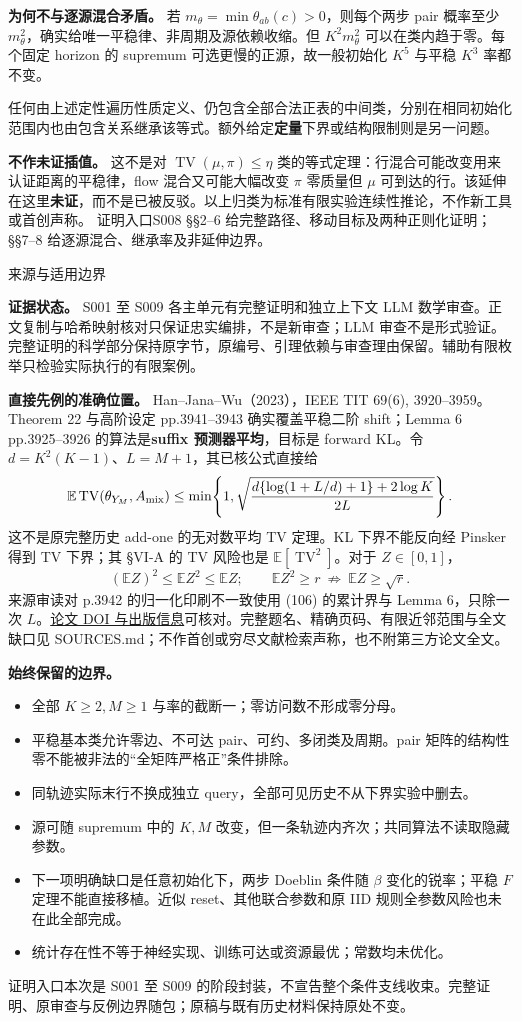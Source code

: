 \documentclass[11pt,a4paper]{article}
\renewcommand{\emph}[1]{\textbf{#1}}
\newcommand{\TV}{\operatorname{TV}}
\newcommand{\E}{\mathbb E}
\newcommand{\head}[2]{\begin{center}{\large\sffamily\color{ink}#1}\end{center}\vspace{-4pt}{\LARGE\bfseries #2}\par\vspace{5pt}}
\newcommand{\entry}[1]{\vfill\noindent\small\textcolor{ink}{证明入口}\quad#1\normalsize}
\begin{document}
\textbf{为何不与逐源混合矛盾。} 若 $m_\theta=\min\theta_{ab}(c)>0$，则每个两步 pair 概率至少 $m_\theta^2$，确实给唯一平稳律、非周期及源依赖收缩。但 $K^2m_\theta^2$ 可以在类内趋于零。每个固定 horizon 的 supremum 可选更慢的正源，故一般初始化 $K^5$ 与平稳 $K^3$ 率都不变。

任何由上述定性遍历性质定义、仍包含全部合法正表的中间类，分别在相同初始化范围内也由包含关系继承该等式。额外给定\emph{定量}下界或结构限制则是另一问题。

\textbf{不作未证插值。} 这不是对 $\TV(\mu,\pi)\le\eta$ 类的等式定理：行混合可能改变用来认证距离的平稳律，flow 混合又可能大幅改变 $\pi$ 零质量但 $\mu$ 可到达的行。该延伸在这里\emph{未证}，而不是已被反驳。以上归类为标准有限实验连续性推论，不作新工具或首创声称。
\entry{S008 §§2--6 给完整路径、移动目标及两种正则化证明；§§7--8 给逐源混合、继承率及非延伸边界。}

\newpage
\head{来源与适用边界}{哪些结论没有被声称}
\textbf{证据状态。} S001 至 S009 各主单元有完整证明和独立上下文 LLM 数学审查。正文复制与哈希映射核对只保证忠实编排，不是新审查；LLM 审查不是形式验证。完整证明的科学部分保持原字节，原编号、引理依赖与审查理由保留。辅助有限枚举只检验实际执行的有限案例。

\textbf{直接先例的准确位置。} Han--Jana--Wu（2023），IEEE TIT 69(6), 3920--3959。Theorem 22 与高阶设定 pp.3941--3943 确实覆盖平稳二阶 shift；Lemma 6 pp.3925--3926 的算法是\textbf{suffix 预测器平均}，目标是 forward KL。令 $d=K^2(K-1)$、$L=M+1$，其已核公式直接给
\[
 \E\TV(\theta_{Y_M},A_{\rm mix})
 \le\min\!\left\{1,\sqrt{\frac{d\{\log(1+L/d)+1\}+2\log K}{2L}}\right\}.
\]
这不是原完整历史 add-one 的无对数平均 TV 定理。KL 下界不能反向经 Pinsker 得到 TV 下界；其 §VI-A 的 TV 风险也是 $\E[\TV^2]$。对于 $Z\in[0,1]$，
\[
 (\E Z)^2\le\E Z^2\le\E Z;
 \qquad\E Z^2\ge r\ \not\Rightarrow\ \E Z\ge\sqrt r.
\]
来源审读对 p.3942 的归一化印刷不一致使用 (106) 的累计界与 Lemma 6，只除一次 $L$。\href{https://doi.org/10.1109/TIT.2023.3239508}{论文 DOI 与出版信息}可核对。完整题名、精确页码、有限近邻范围与全文缺口见 SOURCES.md；不作首创或穷尽文献检索声称，也不附第三方论文全文。

\textbf{始终保留的边界。}
\begin{itemize}
\item 全部 $K\ge2,M\ge1$ 与率的截断一；零访问数不形成零分母。
\item 平稳基本类允许零边、不可达 pair、可约、多闭类及周期。pair 矩阵的结构性零不能被非法的“全矩阵严格正”条件排除。
\item 同轨迹实际末行不换成独立 query，全部可见历史不从下界实验中删去。
\item 源可随 supremum 中的 $K,M$ 改变，但一条轨迹内齐次；共同算法不读取隐藏参数。
\item 下一项明确缺口是任意初始化下，两步 Doeblin 条件随 $\beta$ 变化的锐率；平稳 $F$ 定理不能直接移植。近似 reset、其他联合参数和原 IID 规则全参数风险也未在此全部完成。
\item 统计存在性不等于神经实现、训练可达或资源最优；常数均未优化。
\end{itemize}
\entry{本次是 S001 至 S009 的阶段封装，不宣告整个条件支线收束。完整证明、原审查与反例边界随包；原稿与既有历史材料保持原处不变。}
\end{document}
